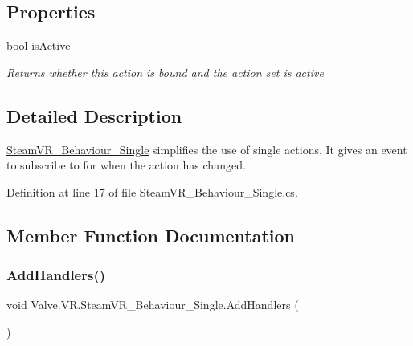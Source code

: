 \subsection*{Properties}
\begin{DoxyCompactItemize}
\item 
bool \mbox{\hyperlink{class_valve_1_1_v_r_1_1_steam_v_r___behaviour___single_a757e6ba799cdbe24713de6c515e51f01}{is\+Active}}
\begin{DoxyCompactList}\small\item\em Returns whether this action is bound and the action set is active \end{DoxyCompactList}\end{DoxyCompactItemize}


\subsection{Detailed Description}
\mbox{\hyperlink{class_valve_1_1_v_r_1_1_steam_v_r___behaviour___single}{Steam\+V\+R\+\_\+\+Behaviour\+\_\+\+Single}} simplifies the use of single actions. It gives an event to subscribe to for when the action has changed. 



Definition at line 17 of file Steam\+V\+R\+\_\+\+Behaviour\+\_\+\+Single.\+cs.



\subsection{Member Function Documentation}
\mbox{\label{class_valve_1_1_v_r_1_1_steam_v_r___behaviour___single_a2e5be52bb32e7ac3a0c73d9a375a4e43}} 
\subsubsection{\texorpdfstring{AddHandlers()}{AddHandlers()}}
{\footnotesize\ttfamily void Valve.\+V\+R.\+Steam\+V\+R\+\_\+\+Behaviour\+\_\+\+Single.\+Add\+Handlers (\begin{DoxyParamCaption}{ }\end{DoxyParamCaption})\hspace{0.3cm}{\ttfamily [protected]}}



